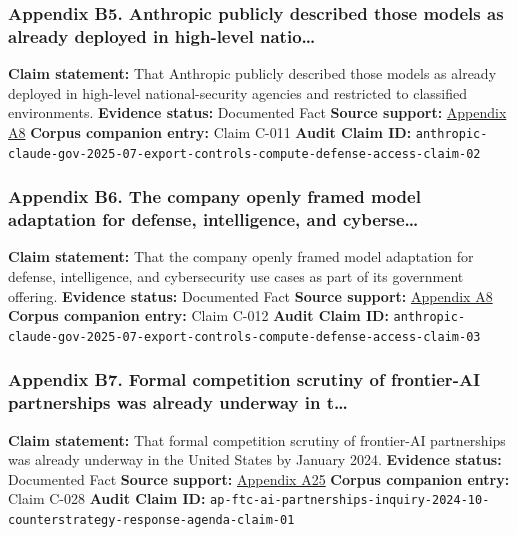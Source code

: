 \documentclass[
  american,
  11pt,
  letterpaper,
]{article}
\begin{document}
\subsubsection{Appendix B5. Anthropic publicly described those models as
already deployed in high-level
natio\ldots{}}\label{appendix-b5-anthropic-publicly-described-those-models-as-already-deployed-in-high-level-natio}

\textbf{Claim statement:} That Anthropic publicly described those models
as already deployed in high-level national-security agencies and
restricted to classified environments. \textbf{Evidence status:}
Documented Fact \textbf{Source support:}
\hyperref[appendix-a8-claude-gov-models-for-u-s-national-security-customers]{Appendix
A8} \textbf{Corpus companion entry:} Claim C-011 \textbf{Audit Claim
ID:}
\texttt{anthropic-claude-gov-2025-07-export-controls-compute-defense-access-claim-02}

\subsubsection{Appendix B6. The company openly framed model adaptation
for defense, intelligence, and
cyberse\ldots{}}\label{appendix-b6-the-company-openly-framed-model-adaptation-for-defense-intelligence-and-cyberse}

\textbf{Claim statement:} That the company openly framed model
adaptation for defense, intelligence, and cybersecurity use cases as
part of its government offering. \textbf{Evidence status:} Documented
Fact \textbf{Source support:}
\hyperref[appendix-a8-claude-gov-models-for-u-s-national-security-customers]{Appendix
A8} \textbf{Corpus companion entry:} Claim C-012 \textbf{Audit Claim
ID:}
\texttt{anthropic-claude-gov-2025-07-export-controls-compute-defense-access-claim-03}

\subsubsection{Appendix B7. Formal competition scrutiny of frontier-AI
partnerships was already underway in
t\ldots{}}\label{appendix-b7-formal-competition-scrutiny-of-frontier-ai-partnerships-was-already-underway-in-t}

\textbf{Claim statement:} That formal competition scrutiny of
frontier-AI partnerships was already underway in the United States by
January 2024. \textbf{Evidence status:} Documented Fact \textbf{Source
support:}
\hyperref[appendix-a25-ftc-opens-inquiry-into-big-tech-s-partnerships-with-leading-ai-startups]{Appendix
A25} \textbf{Corpus companion entry:} Claim C-028 \textbf{Audit Claim
ID:}
\texttt{ap-ftc-ai-partnerships-inquiry-2024-10-counterstrategy-response-agenda-claim-01}
\end{document}
